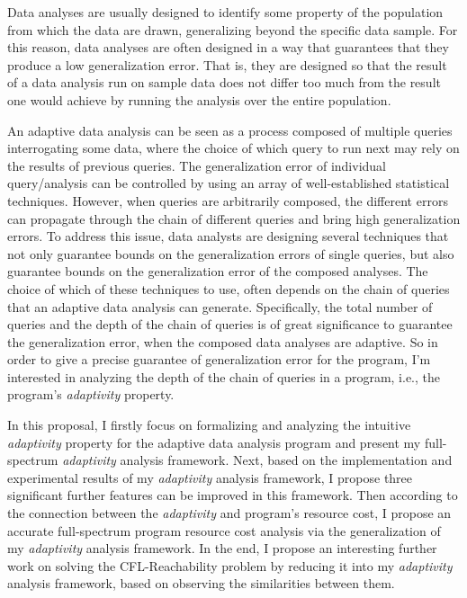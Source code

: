 Data analyses are usually designed to identify some property of the population from which the data are drawn, generalizing beyond the specific data sample. For this reason, data analyses are often designed in a way that guarantees that they produce a low generalization error.
 That is, they are designed so that the result of a data analysis run on sample data does not differ too much from the result one would achieve by running the analysis over the entire population. 
 
 An adaptive data analysis can be seen as a process composed of multiple queries interrogating some data, where the choice of which query to run next may rely on the results of previous queries. 
 The generalization error of individual query/analysis can be controlled by using an array of well-established statistical techniques.
 However, when queries are arbitrarily composed, the different errors can propagate through the chain of different queries and bring high generalization errors. 
 To address this issue, data analysts are designing several techniques that not only guarantee bounds on the generalization errors of single queries, but also guarantee bounds on the generalization error of the composed analyses. 
 The choice of which of these techniques to use, 
 often depends on the chain of queries that an adaptive data analysis can generate.
 Specifically, the total number of queries and the depth of the chain of queries is of great significance 
 to guarantee the generalization error, 
 when the composed data analyses are adaptive. 
 So in order to give a precise guarantee of generalization error
 for the program,
 I'm interested in analyzing the depth of the chain of queries in a program, i.e., the program's \emph{adaptivity} property.

 In this proposal, I firstly focus on formalizing and analyzing the intuitive \emph{adaptivity} property for 
 the adaptive data analysis program
 and present 
 my full-spectrum \emph{adaptivity} analysis framework.
 Next, based on the implementation and experimental results of my \emph{adaptivity} analysis framework, 
 I propose three significant 
 further features can be improved in this framework.
Then according to the connection between the \emph{adaptivity} and program's resource cost,
I propose 
an accurate full-spectrum program resource cost analysis via
the generalization of my \emph{adaptivity} analysis framework.
In the end, 
I propose an interesting further work on solving the 
CFL-Reachability problem by reducing it into my \emph{adaptivity} analysis framework, 
based on observing the similarities between them.
